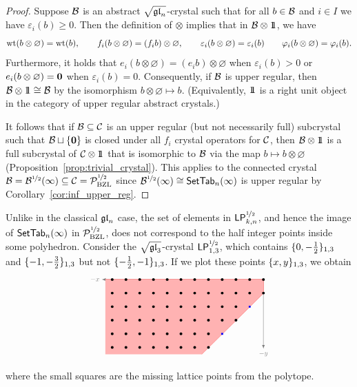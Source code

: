 \documentclass[11pt]{article}
\begin{document}
\begin{proof}
Suppose $\cB$ is an abstract $\sqgln$-crystal such that for all $b \in \cB$ and $i \in I$ we have $\varepsilon_i(b) \geq0$.
Then the definition of $\otimes$ implies that in $\cB\otimes \one$, we have
\[
\weight(b\otimes \varnothing) = \weight(b),
\qquad
f_i(b\otimes\varnothing) = (f_i b) \otimes \varnothing,
\qquad
\varepsilon_i(b\otimes \varnothing) = \varepsilon_i(b)
\qquad
\varphi_i(b\otimes \varnothing) = \varphi_i(b).
\]
Furthermore, it holds that $e_i(b\otimes \varnothing) = (e_i b) \otimes \varnothing$ when $\varepsilon_i(b)>0$ or $e_i(b\otimes \varnothing)=\zero$ when $\varepsilon_i(b)=0$. 
Consequently, if $\cB$ is upper regular, then $\cB \otimes \one \iso \cB$ by the isomorphism $b \otimes \varnothing \mapsto b$.
(Equivalently, $\one$ is a right unit object in the category of upper regular abstract crystals.)


It follows that if $\cB\subseteq \cC$ is an upper regular (but not necessarily full) subcrystal such that $\cB\sqcup \{\zero\}$ is closed under all $f_i$ crystal operators for $\cC$, then $\cB \otimes \one$ is a full subcrystal of $\cC\otimes \one$ that is isomorphic to $\cB$ via the map $b\mapsto b\otimes \varnothing$ (Proposition~\ref{prop:trivial_crystal}).
This applies to the connected crystal  $\cB = \sqrtB(\infty) \subseteq \cC = \sqrtE_{\BZL}$ since $\sqrtB(\infty) \iso \SetTab_n(\infty) $ is upper regular by Corollary~\ref{cor:inf_upper_reg}.
\end{proof}

\begin{example}
\label{ex:not_polyhedral}
Unlike in the classical $\gl_n$ case, the set of elements in $\PCrysR{k}$, and hence the image of $\SetTab_n(\infty)$ in $\sqrtE_{\BZL}$, does not correspond to the half integer points inside some polyhedron.
Consider the $\sqrt{\gl_3}$-crystal $\mathsf{LP}_{1,3}^{\halfpower}$, which contains $\uj{1,3}{0,-\tfrac{1}{2}}$ and $\uj{1,3}{-1,-\tfrac{3}{2}}$ but not $\uj{1,3}{-\tfrac{1}{2},-1}$.
If we plot these points $\uj{1,3}{x,y}$, we obtain
\[
\begin{tikzpicture}[scale=.5]
\draw[->,gray,>=latex] (0,0) -- (-11.75,0) node[anchor=east,scale=.7] {$-x$};
\draw[->,gray,>=latex] (0,0) -- (0,-5.1) node[anchor=north,scale=.7] {$-y$};
\draw[-,red!50,thick] (-11.5,0) -- (0,0) -- (0,-1) -- (-4.5,-5.5);
\fill[red!30] (-11.5,0) -- (0,0) -- (0,-1) -- (-4.5,-5.5) -- (-11.5,-5.5) -- (-11.5,0);
\foreach \y in {-2,...,0} {
  \foreach \x in {-5,...,\y} {
    \fill (2*\x,2*\y-1) circle (.1);
    \fill (2*\x,2*\y) circle (.1);
    \fill (2*\x-1,2*\y-1) circle (.1);
    \fill (2*\x-1,2*\y) circle (.1);
  }
}
\fill[blue] ++(-1,-2) + (.07,.07) rectangle ++(-.07,-.07);
\fill[blue] ++(-3,-4) + (.07,.07) rectangle ++(-.07,-.07);
\end{tikzpicture}
\]
where the small squares are the missing lattice points from the polytope.
\end{example}
\end{document}
